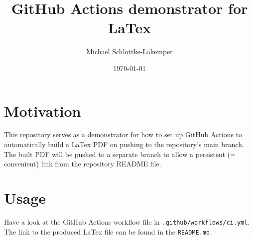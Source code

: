 \documentclass[a4paper,10pt]{article}
\title{GitHub Actions demonstrator for LaTex}
\author{Michael Schlottke-Lakemper}
\date{\today}
\begin{document}
\maketitle

\onehalfspacing

\section{Motivation}
This repository serves as a demonstrator for how to set up GitHub Actions to automatically build a
LaTex PDF on pushing to the repository's main branch. The built PDF will be pushed to a separate
branch to allow a persistent (= convenient) link from the repository README file.

\section{Usage}
Have a look at the GitHub Actions workflow file in \texttt{.github/workflows/ci.yml}. The link to
the produced LaTex file can be found in the \texttt{README.md}.
\end{document}
